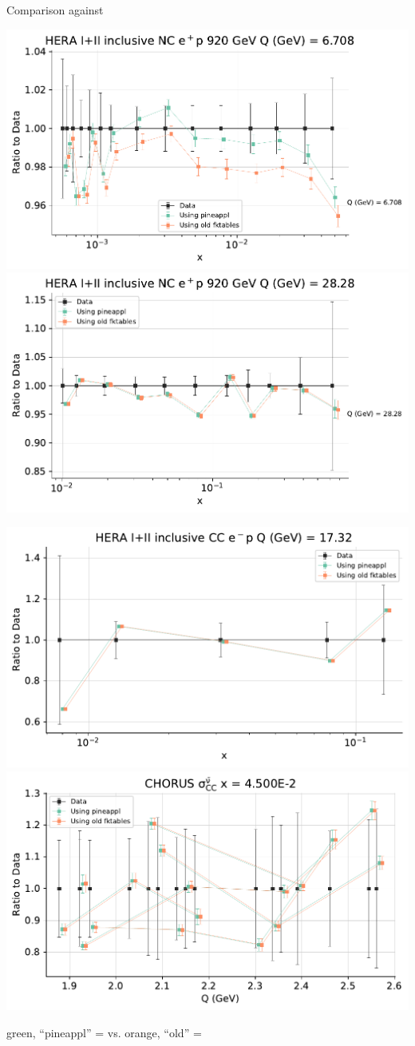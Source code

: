 \documentclass[10pt, usepdftitle=false]{beamer}
\begin{document}
\begin{frame}{Comparison \yadism{} against \apfel{}}
	\begin{center}
		\includegraphics[width=.47\linewidth]{matched_datasets_from_dataspecs14_dataset_report_Datanorm_plot_fancy_dataspecs_11.pdf}%
		\quad%
		\includegraphics[width=.47\linewidth]{matched_datasets_from_dataspecs14_dataset_report_Datanorm_plot_fancy_dataspecs_23.pdf}

		\includegraphics[width=.47\linewidth]{matched_datasets_from_dataspecs4_dataset_report_Datanorm_plot_fancy_dataspecs_0.pdf}%
		\quad%
		\includegraphics[width=.47\linewidth]{matched_datasets_from_dataspecs2_dataset_report_Datanorm_plot_fancy_dataspecs_0.pdf}

		{\color{vpGreen} green}, \enquote{pineappl} = \yadism{} vs. {\color{vpOrange} orange}, \enquote{old} = \apfel{}
	\end{center}
\end{frame}
\end{document}
